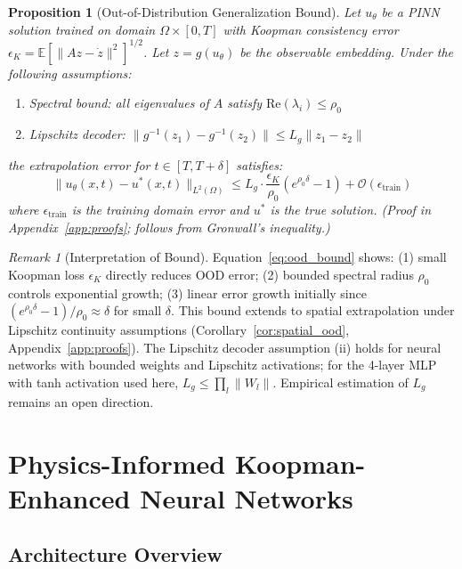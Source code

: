 \documentclass{article}
\newtheorem{proposition}{Proposition}
\theoremstyle{remark}
\newtheorem{remark}{Remark}
\begin{document}
\begin{proposition}[Out-of-Distribution Generalization Bound]
\label{prop:ood_bound}
Let $u_\theta$ be a PINN solution trained on domain $\Omega \times [0, T]$ with Koopman consistency error $\epsilon_K = \mathbb{E}[\|Az - \dot{z}\|^2]^{1/2}$. Let $z = g(u_\theta)$ be the observable embedding. Under the following assumptions:
\begin{enumerate}[label=(\roman*)]
    \item Spectral bound: all eigenvalues of $A$ satisfy $\text{Re}(\lambda_i) \leq \rho_0$
    \item Lipschitz decoder: $\|g^{-1}(z_1) - g^{-1}(z_2)\| \leq L_g\|z_1 - z_2\|$
\end{enumerate}
the extrapolation error for $t \in [T, T + \delta]$ satisfies:
\begin{equation}
\|u_\theta(x, t) - u^*(x, t)\|_{L^2(\Omega)} \leq L_g \cdot \frac{\epsilon_K}{\rho_0}\left(e^{\rho_0 \delta} - 1\right) + \mathcal{O}(\epsilon_{\text{train}})
\label{eq:ood_bound}
\end{equation}
where $\epsilon_{\text{train}}$ is the training domain error and $u^*$ is the true solution. (Proof in Appendix~\ref{app:proofs}; follows from Gronwall's inequality.)
\end{proposition}

\begin{remark}[Interpretation of Bound]
Equation~\ref{eq:ood_bound} shows: (1) small Koopman loss $\epsilon_K$ directly reduces OOD error; (2) bounded spectral radius $\rho_0$ controls exponential growth; (3) linear error growth initially since $(e^{\rho_0\delta} - 1)/\rho_0 \approx \delta$ for small $\delta$. This bound extends to spatial extrapolation under Lipschitz continuity assumptions (Corollary~\ref{cor:spatial_ood}, Appendix~\ref{app:proofs}). The Lipschitz decoder assumption (ii) holds for neural networks with bounded weights and Lipschitz activations; for the 4-layer MLP with tanh activation used here, $L_g \leq \prod_l \|W_l\|$. Empirical estimation of $L_g$ remains an open direction.
\end{remark}

\section{Physics-Informed Koopman-Enhanced Neural Networks}
\label{sec:method}

\subsection{Architecture Overview}
\end{document}
